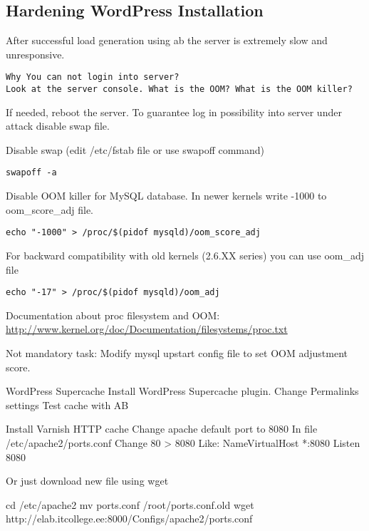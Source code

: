 \subsection{Hardening WordPress Installation}
After successful load generation using ab the server is extremely slow and unresponsive.

\begin{Verbatim}[samepage=true,frame=single,
label=Discussion,framesep=2mm,rulecolor=\color{blue},commandchars=\\\{\}]
Why You can not login into server?
Look at the server console. What is the OOM? What is the OOM killer?
\end{Verbatim}


If needed, reboot the server. To  guarantee log in possibility into server under attack disable swap file.

Disable swap (edit /etc/fstab file or use swapoff command)


\begin{verbatim}
swapoff -a
\end{verbatim}

Disable OOM killer for MySQL database. In newer kernels write -1000 to oom\_score\_adj file.

\begin{verbatim}
echo "-1000" > /proc/$(pidof mysqld)/oom_score_adj
\end{verbatim}
For backward compatibility with old kernels (2.6.XX series) you can use oom\_adj file
\begin{verbatim}
echo "-17" > /proc/$(pidof mysqld)/oom_adj
\end{verbatim}
Documentation about proc filesystem and OOM:
\url{http://www.kernel.org/doc/Documentation/filesystems/proc.txt}

Not mandatory task: Modify mysql upstart config file to set OOM adjustment score.

WordPress Supercache
Install WordPress Supercache plugin.
Change Permalinks settings
Test cache with AB

Install Varnish HTTP cache
Change apache default port to 8080
In file /etc/apache2/ports.conf
Change 80 > 8080
Like:
NameVirtualHost *:8080
Listen 8080

Or just download new file using wget 

cd /etc/apache2
mv ports.conf /root/ports.conf.old
wget http://elab.itcollege.ee:8000/Configs/apache2/ports.conf

